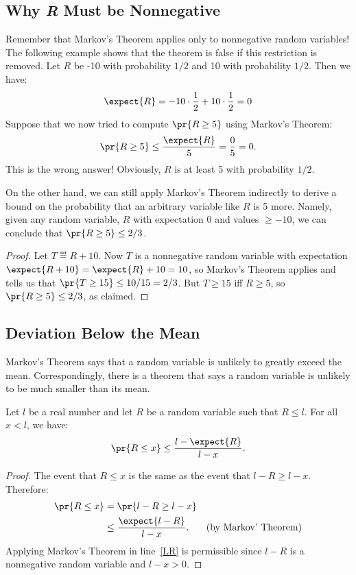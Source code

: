 \begin{editingnotes}

\subsection{Why \emph{R} Must be Nonnegative}

Remember that Markov's Theorem applies only to nonnegative random
variables!  The following example shows that the theorem is false if this
restriction is removed.  Let $R$ be -10 with probability $1/2$ and 10 with
probability $1/2$.  Then we have:
\[
\expect{R} = -10 \cdot \frac{1}{2} + 10 \cdot \frac{1}{2} = 0
\]
Suppose that we now tried to compute $\pr{R \geq 5}$ using Markov's
Theorem:
\begin{displaymath}
  \pr{R \geq 5} \leq \frac{\expect{R}}{5} = \frac{0}{5} = 0.
\end{displaymath}
This is the wrong answer!  Obviously, $R$ is at least 5 with
probability $1/2$.  

On the other hand, we can still apply Markov's Theorem indirectly to
derive a bound on the probability that an arbitrary variable like $R$ is 5
more.  Namely, given any random variable, $R$ with expectation 0 and
values $\geq -10$, we can conclude that $\pr{R \geq 5} \le 2/3$.
\begin{proof}
Let $T \eqdef R+10$.  Now $T$ is a nonnegative random variable with
expectation $\expect{R + 10} = \expect{R}+10= 10$, so Markov's Theorem
applies and tells us that $\pr{T \geq 15} \le 10/15 = 2/3$.  But $T \geq
15$ iff $R \geq 5$, so $\pr{R \geq 5} \leq 2/3$, as claimed.
\end{proof}

\subsection{Deviation Below the Mean}

Markov's Theorem says that a random variable is unlikely to greatly exceed
the mean.  Correspondingly, there is a theorem that says a random variable
is unlikely to be much smaller than its mean.

\begin{theorem}
\label{th:below}
Let $l$ be a real number and let $R$ be a random variable such that $R
\leq l$.  For all $x < l$, we have:
\[
\pr{R \leq x} \leq \frac{l - \expect{R}}{l - x}.
\]
\end{theorem}

\begin{proof}
The event that $R \leq x$ is the same as the event that $l - R \geq l -
x$.  Therefore:
\begin{align}
\pr{R \leq x} &  = \pr{l - R \geq l - x}\notag\\
 & \leq \frac{\expect{l - R}}{l - x}. & \text{(by Markov' Theorem)}\label{LR}
\end{align}
Applying Markov's Theorem in line~\eqref{LR} is permissible
since $l - R$ is a nonnegative random variable and $l - x > 0$.
\end{proof}


\end{editingnotes}
